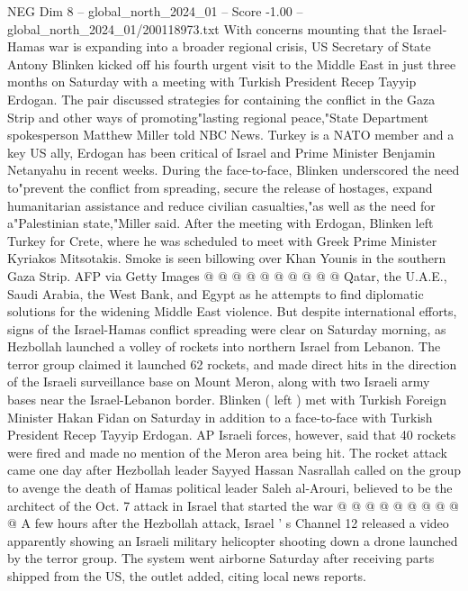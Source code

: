 \begin{textsample}{NEG Dim 8 – global\_north\_2024\_01 – Score -1.00 – global\_north\_2024\_01/200118973.txt}  \label{ex:f8_neg_278}
With concerns mounting that the Israel-Hamas war is expanding into a broader regional crisis, US Secretary of State Antony Blinken kicked off his fourth urgent visit to the Middle East in just three months on Saturday with a meeting with Turkish President Recep Tayyip Erdogan.
The pair discussed strategies for containing the conflict in the Gaza Strip and other ways of promoting"lasting regional peace,"State Department spokesperson Matthew Miller told NBC News.
Turkey is a NATO member and a key US ally, Erdogan has been critical of Israel and Prime Minister Benjamin Netanyahu in recent weeks.
During the face-to-face, Blinken underscored the need to"prevent the conflict from spreading, secure the release of hostages, expand humanitarian assistance and reduce civilian casualties,"as well as the need for a"Palestinian state,"Miller said.
After the meeting with Erdogan, Blinken left Turkey for Crete, where he was scheduled to meet with Greek Prime Minister Kyriakos Mitsotakis.
Smoke is seen billowing over Khan Younis in the southern Gaza Strip.
AFP via Getty Images @ @ @ @ @ @ @ @ @ @ Qatar, the U.A.E., Saudi Arabia, the West Bank, and Egypt as he attempts to find diplomatic solutions for the widening Middle East violence.
But despite international efforts, signs of the Israel-Hamas conflict spreading were clear on Saturday morning, as Hezbollah launched a volley of rockets into northern Israel from Lebanon.
The terror group claimed it launched 62 rockets, and made direct hits in the direction of the Israeli surveillance base on Mount Meron, along with two Israeli army bases near the Israel-Lebanon border.
Blinken ( left ) met with Turkish Foreign Minister Hakan Fidan on Saturday in addition to a face-to-face with Turkish President Recep Tayyip Erdogan.
AP Israeli forces, however, said that 40 rockets were fired and made no mention of the Meron area being hit.
The rocket attack came one day after Hezbollah leader Sayyed Hassan Nasrallah called on the group to avenge the death of Hamas political leader Saleh al-Arouri, believed to be the architect of the Oct. 7 attack in Israel that started the war @ @ @ @ @ @ @ @ @ @ A few hours after the Hezbollah attack, Israel ' s Channel 12 released a video apparently showing an Israeli military helicopter shooting down a drone launched by the terror group.
The system went airborne Saturday after receiving parts shipped from the US, the outlet added, citing local news reports.

\end{textsample}
